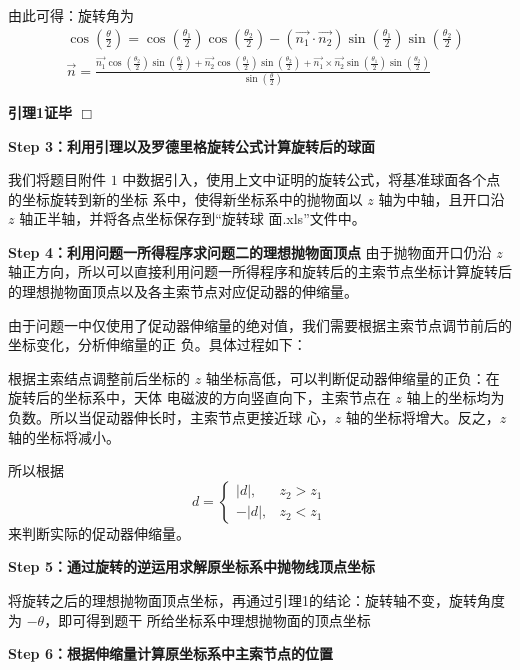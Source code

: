 \documentclass[withoutpreface,bwprint]{cumcmthesis} %
\begin{document}
由此可得：旋转角为
\[
    \begin{split}
        &\cos(\frac{\theta}{2}) = \cos(\frac{\theta _1}{2})
        \cos(\frac{\theta _2}{2}) - (\overrightarrow{n_1} \cdot 
        \overrightarrow{n_2})\sin(\frac{\theta _1}{2})
        \sin(\frac{\theta _2}{2}) \\
        &\overrightarrow{n} = \frac{\displaystyle \overrightarrow{n_1}
        \cos(\frac{\theta _2}{2})\sin(\frac{\theta _1}{2}) + 
        \overrightarrow{n_2}\cos(\frac{\theta _1}{2})
        \sin(\frac{\theta _2}{2}) + \overrightarrow{n_1} \times 
        \overrightarrow{n_2}\sin(\frac{\theta _1}{2})
        \sin(\frac{\theta _2}{2})}
        {\displaystyle \sin(\frac{\theta}{2})} 
    \end{split}
\]\par
\textbf{引理1证毕 $\Box$}

\medskip
\medskip
\medskip
\textbf{Step 3：利用引理以及罗德里格旋转公式计算旋转后的球面}

我们将题目附件 $1$ 中数据引入，使用上文中证明的旋转公式，将基准球面各个点的坐标旋转到新的坐标
系中，使得新坐标系中的抛物面以 $z$ 轴为中轴，且开口沿 $z$ 轴正半轴，并将各点坐标保存到“旋转球
面.xls”文件中。

\textbf{Step 4：利用问题一所得程序求问题二的理想抛物面顶点}
由于抛物面开口仍沿 $z$ 轴正方向，所以可以直接利用问题一所得程序和旋转后的主索节点坐标计算旋转后
的理想抛物面顶点以及各主索节点对应促动器的伸缩量。

由于问题一中仅使用了促动器伸缩量的绝对值，我们需要根据主索节点调节前后的坐标变化，分析伸缩量的正
负。具体过程如下：

根据主索结点调整前后坐标的 $z$ 轴坐标高低，可以判断促动器伸缩量的正负：在旋转后的坐标系中，天体
电磁波的方向竖直向下，主索节点在 $z$ 轴上的坐标均为负数。所以当促动器伸长时，主索节点更接近球
心，$z$ 轴的坐标将增大。反之，$z$ 轴的坐标将减小。

所以根据
\[
    d = 
    \left\{
        \begin{array}{rl}
            |d|,&z_2>z_1 \\
            -|d|,&z_2<z_1
        \end{array}
    \right.
\]
来判断实际的促动器伸缩量。

\textbf{Step 5：通过旋转的逆运用求解原坐标系中抛物线顶点坐标}

将旋转之后的理想抛物面顶点坐标，再通过引理1的结论：旋转轴不变，旋转角度为 $-\theta$，即可得到题干
所给坐标系中理想抛物面的顶点坐标

\textbf{Step 6：根据伸缩量计算原坐标系中主索节点的位置}
\end{document}

